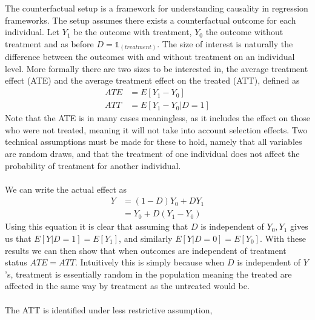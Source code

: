 The counterfactual setup is a framework for understanding causality in regression frameworks. The setup assumes there exists a counterfactual outcome for each individual. Let $Y_1$ be the outcome with treatment, $Y_0$ the outcome without treatment and as before $D = \mathds{1}_{(treatment)}$. The size of interest is naturally the difference between the outcomes with and without treatment on an individual level. More formally there are two sizes to be interested in, the average treatment effect (ATE) and the average treatment effect on the treated (ATT), defined as
\begin{equation}
\begin{split}
ATE &= E[Y_1 - Y_0] \\
ATT &= E[Y_1 - Y_0| D = 1]
\end{split}
\end{equation}
Note that the ATE is in many cases meaningless, as it includes the effect on those who were not treated, meaning it will not take into account selection effects. Two technical assumptions must be made for these to hold, namely that all variables are random draws, and that the treatment of one individual does not affect the probability of treatment for another individual.
\\ \\
We can write the actual effect as
\begin{equation}
\begin{split}
Y &= (1-D)Y_0 + D Y_1 \\
& = Y_0 + D(Y_1 - Y_0)
\end{split}
\end{equation}
Using this equation it is clear that assuming that $D$ is independent of $Y_0, Y_1$ gives us that $E[Y|D=1] = E[Y_1]$, and similarly $E[Y|D = 0] = E[Y_0]$. With these results we can then show that when outcomes are independent of treatment status $ATE = ATT$. Intuitively this is simply because when $D$ is independent of $Y$'s, treatment is essentially random in the population meaning the treated are affected in the same way by treatment as the untreated would be.
\\ \\
The ATT is identified under less restrictive assumption, 
